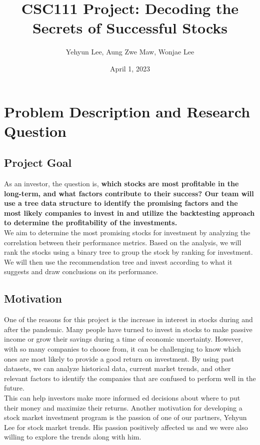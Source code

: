 \documentclass[fontsize=11pt]{article}
\title{CSC111 Project: Decoding the Secrets of Successful Stocks}
\author{Yehyun Lee, Aung Zwe Maw, Wonjae Lee}
\date{April 1, 2023}
\begin{document}
\maketitle
\section{Problem Description and Research Question}

\subsection{Project Goal}
As an investor, the question is, \textbf{which stocks are most profitable in the long-term, and what factors contribute to their success? Our team will use a tree data structure to identify the promising factors and the most likely companies to invest in and utilize the backtesting approach to determine the profitability of the investments.}
\\

We aim to determine the most promising stocks for investment by analyzing the correlation between their performance metrics. Based on the analysis, we will rank the stocks using a binary tree to group the stock by ranking for investment. We will then use the recommendation tree and invest according to what it suggests and draw conclusions on its performance.

\subsection{Motivation}
One of the reasons for this project is the increase in interest in stocks during and after the pandemic. Many people have turned to invest in stocks to make passive income or grow their savings during a time of economic uncertainty. However, with so many companies to choose from, it can be challenging to know which ones are most likely to provide a good return on investment. 
By using past datasets, we can analyze historical data, current market trends, and other relevant factors to identify the companies that are confused to perform well in the future. \\
This can help investors make more informed ed decisions about where to put their money and maximize their returns. Another motivation for developing a stock market investment program is the passion of one of our partners, Yehyun Lee for stock market trends. His passion positively affected us and we were also willing to explore the trends along with him.
\end{document}

